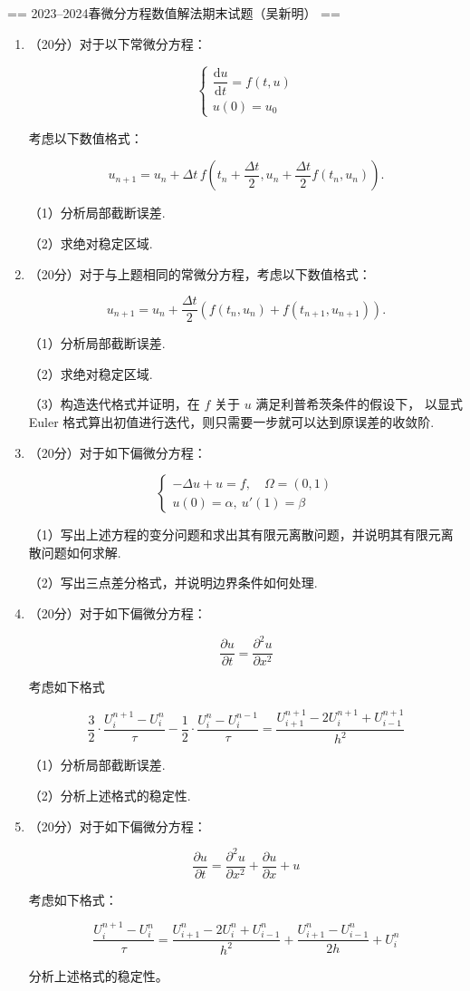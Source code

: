 == 2023--2024春微分方程数值解法期末试题（吴新明） ==

\begin{enumerate}

\item（20分）对于以下常微分方程：

\[
\begin{cases}
    \dfrac{\mathrm{d}u}{\mathrm{d}t} = f(t,u)  \\
    u(0) = u_0
\end{cases}
\]

考虑以下数值格式：

$$
u_{n+1}=u_n+\Delta t\, f\left(t_n+\frac{\Delta t}{2}, u_n+\frac{\Delta t}{2} f(t_n, u_n)\right) .
$$

（1）分析局部截断误差.

（2）求绝对稳定区域.

\item（20分）对于与上题相同的常微分方程，考虑以下数值格式：

$$
u_{n+1}=u_n+\frac{\Delta t}{2}\left(f(t_n, u_n)+f(t_{n+1}, u_{n+1})\right) .
$$

（1）分析局部截断误差.

（2）求绝对稳定区域.

（3）构造迭代格式并证明，在 $f$ 关于 $u$ 满足利普希茨条件的假设下，
以显式 Euler 格式算出初值进行迭代，则只需要一步就可以达到原误差的收敛阶.


\item（20分）对于如下偏微分方程：

\[
\begin{cases}
    - \Delta u + u =f , \quad \Omega = (0,1)\\
    u(0)=\alpha,\ u'(1)=\beta
\end{cases}
\]

（1）写出上述方程的变分问题和求出其有限元离散问题，并说明其有限元离散问题如何求解.

（2）写出三点差分格式，并说明边界条件如何处理.

\item（20分）对于如下偏微分方程：

\[
\frac{\partial u}{\partial t}= \frac{\partial^{2} u}{\partial x^{2}}
\]

考虑如下格式

\[ \frac{3}{2} \cdot \frac{U_i^{n+1}-U_i^n}{\tau}-\frac{1}{2} \cdot \frac{U_i^n-U_i^{n-1}}{\tau}=\frac{U_{i+1}^{n+1}-2 U_i^{n+1}+U_{i-1}^{n+1}}{h^2} 
\]

（1）分析局部截断误差.

（2）分析上述格式的稳定性.


\item（20分）对于如下偏微分方程：

\[
 \frac{\partial u}{\partial t}=\frac{\partial^2 u}{\partial x^2}+\frac{\partial u}{\partial x}+u 
\]

考虑如下格式：

\[
 \frac{U_i^{n+1}-U_i^n}{\tau}=\frac{U_{i+1}^n-2 U_i^n+U_{i-1}^n}{h^2}+\frac{U_{i+1}^n-U_{i-1}^n}{2 h}+U_i^n
\]


分析上述格式的稳定性。
\end{enumerate}